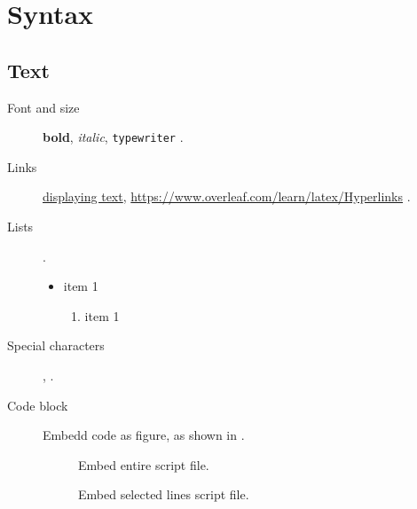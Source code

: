 \section{Syntax}

\subsection{Text}

\begin{description}
    \item[Font and size] \textbf{bold}, \textit{italic}, \texttt{typewriter} \cite{overleaf_font}.
    \item[Links] \href{https://www.overleaf.com/learn/latex/Hyperlinks}{displaying text}, \url{https://www.overleaf.com/learn/latex/Hyperlinks} \cite{overleaf_link}.
    \item[Lists] \cite{overleaf_list}.
        \begin{itemize}
            \item item 1
                \begin{enumerate}
                    \item item 1
                \end{enumerate}
        \end{itemize}
    \item[Special characters] ,  \cite{pifont}.
    \item[Code block] Embedd code as figure, as shown in .
        \begin{figure}[H]
        
        \caption{Embed entire script file.}
        \label{fig:embed_ef}
        \end{figure}
        \begin{figure}[H]
        
        \caption{Embed selected lines script file.}
        \label{fig:embed_pf}
        \end{figure}
\end{description}

